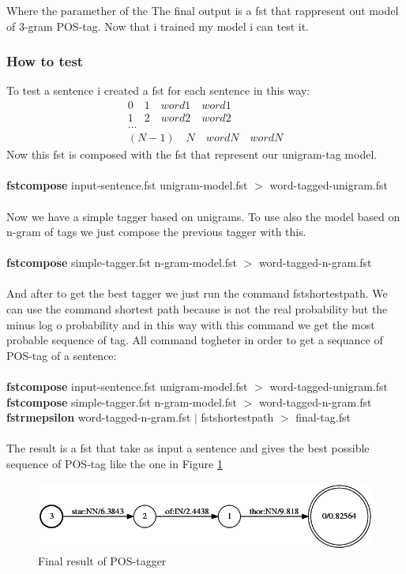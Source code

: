 \documentclass[a4paper,8pt,oneside]{article}
\begin{document}
			Where the paramether of the 
			The final output is a fst that rappresent out model of 3-gram POS-tag.
			Now that i trained my model i can test it.

		\subsubsection{How to test}
		    To test a sentence i created a fst for each sentence in this way:
			\begin{gather*}
					0 \quad 1 \quad word1 \quad word1 \\
					1 \quad 2 \quad word2 \quad word2 \\
					... \\
					(N-1) \quad N \quad wordN \quad wordN	
			\end{gather*}
			Now this fst is composed with the fst that represent our unigram-tag model. \\ \\
			\textbf{fstcompose} input-sentence.fst unigram-model.fst $>$ word-tagged-unigram.fst \\ \\
			Now we have a simple tagger based on unigrams. To use also the model based on n-gram of tags we just compose the previous tagger with this. \\ \\
			\textbf{fstcompose} simple-tagger.fst n-gram-model.fst $>$ word-tagged-n-gram.fst \\ \\
			And after to get the best tagger we just run the command fstshortestpath. We can use the command shortest path because is not the real probability but the minus log o probability and in this way with this command we get the most probable sequence of tag. All command togheter in order to get a sequance of POS-tag of a sentence: \\ \\
			\textbf{fstcompose} input-sentence.fst unigram-model.fst $>$ word-tagged-unigram.fst \\
			\textbf{fstcompose} simple-tagger.fst n-gram-model.fst $>$ word-tagged-n-gram.fst \\
			\textbf{fstrmepsilon} word-tagged-n-gram.fst $|$ fstshortestpath $>$ final-tag.fst \\ \\

			The result is a fst that take as input a sentence and gives the best possible sequence of POS-tag like the one in Figure \ref{tagger-final}
			\begin{figure}[h!]
			  \centering
			    \includegraphics[width=1.0\textwidth]{img/tagger}
			  \caption{Final result of POS-tagger}
			  \label{tagger-final}
			\end{figure}
\end{document}
